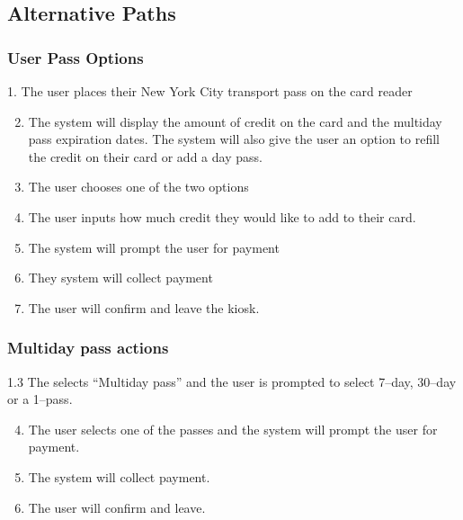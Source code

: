 \documentclass{article}
\begin{document}
        \subsection{Alternative Paths}
            \subsubsection{User Pass Options}
                1. The user places their New York City transport pass on the
                card reader 
                    \begin{enumerate}
                        \setcounter{enumi}{1}

                        \item The system will display the amount of credit on the card and the multiday 
                        pass expiration dates. The system will also give the user an option to refill the
                        credit on their card or add a day pass.
                        \item The user chooses one of the two options
                        \item The user inputs how much credit they would like to add to their card.
                        \item The system will prompt the user for payment
                        \item They system will collect payment
                        \item The user will confirm and leave the kiosk.
                    \end{enumerate}

            \subsubsection{Multiday pass actions}
            1.3 The selects ``Multiday pass'' and the user is prompted to select 7--day, 30--day or a
            1--pass.
                \begin{enumerate}
                    \setcounter{enumi}{3}
                    \item The user selects one of the passes and the system will prompt the user
                    for payment.
                    \item The system will collect payment.
                    \item The user will confirm and leave.
                \end{enumerate}
\end{document}
